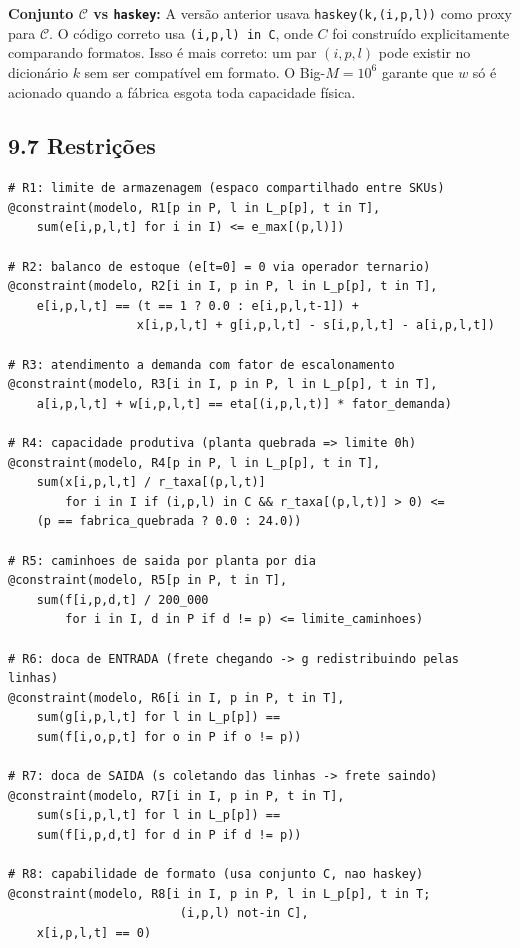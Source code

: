 \documentclass[12pt, a4paper]{article}
\begin{document}
\begin{mdframed}[style=destaque]
\textbf{\color{ballblue}Conjunto $\mathcal{C}$ vs \texttt{haskey}:}
A vers\~{a}o anterior usava \texttt{haskey(k,(i,p,l))} como proxy para $\mathcal{C}$.
O c\'{o}digo correto usa \texttt{(i,p,l) in C}, onde $C$ foi constru\'{i}do
explicitamente comparando formatos. Isso \'{e} mais correto: um par $(i,p,l)$ pode
existir no dicion\'{a}rio $k$ sem ser compat\'{i}vel em formato.
O Big-$M = 10^6$ garante que $w$ s\'{o} \'{e} acionado quando a f\'{a}brica esgota
toda capacidade f\'{i}sica.
\end{mdframed}

\subsection*{9.7 Restri\c{c}\~{o}es}

\begin{mdframed}[style=codigo]
\begin{lstlisting}
# R1: limite de armazenagem (espaco compartilhado entre SKUs)
@constraint(modelo, R1[p in P, l in L_p[p], t in T],
    sum(e[i,p,l,t] for i in I) <= e_max[(p,l)])

# R2: balanco de estoque (e[t=0] = 0 via operador ternario)
@constraint(modelo, R2[i in I, p in P, l in L_p[p], t in T],
    e[i,p,l,t] == (t == 1 ? 0.0 : e[i,p,l,t-1]) +
                  x[i,p,l,t] + g[i,p,l,t] - s[i,p,l,t] - a[i,p,l,t])

# R3: atendimento a demanda com fator de escalonamento
@constraint(modelo, R3[i in I, p in P, l in L_p[p], t in T],
    a[i,p,l,t] + w[i,p,l,t] == eta[(i,p,l,t)] * fator_demanda)

# R4: capacidade produtiva (planta quebrada => limite 0h)
@constraint(modelo, R4[p in P, l in L_p[p], t in T],
    sum(x[i,p,l,t] / r_taxa[(p,l,t)]
        for i in I if (i,p,l) in C && r_taxa[(p,l,t)] > 0) <=
    (p == fabrica_quebrada ? 0.0 : 24.0))

# R5: caminhoes de saida por planta por dia
@constraint(modelo, R5[p in P, t in T],
    sum(f[i,p,d,t] / 200_000
        for i in I, d in P if d != p) <= limite_caminhoes)

# R6: doca de ENTRADA (frete chegando -> g redistribuindo pelas linhas)
@constraint(modelo, R6[i in I, p in P, t in T],
    sum(g[i,p,l,t] for l in L_p[p]) ==
    sum(f[i,o,p,t] for o in P if o != p))

# R7: doca de SAIDA (s coletando das linhas -> frete saindo)
@constraint(modelo, R7[i in I, p in P, t in T],
    sum(s[i,p,l,t] for l in L_p[p]) ==
    sum(f[i,p,d,t] for d in P if d != p))

# R8: capabilidade de formato (usa conjunto C, nao haskey)
@constraint(modelo, R8[i in I, p in P, l in L_p[p], t in T;
                        (i,p,l) not-in C],
    x[i,p,l,t] == 0)
\end{lstlisting}
\end{mdframed}
\end{document}
